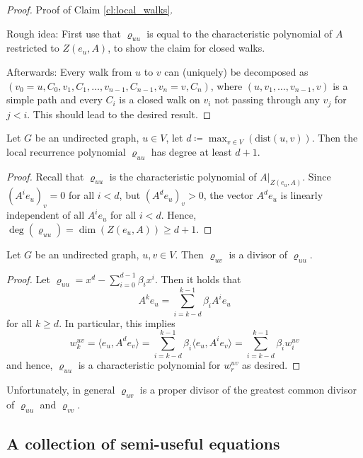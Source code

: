 \documentclass[a4paper,12pt]{article}
\begin{document}
\begin{proof}
Proof of Claim \ref{cl:local_walks}.

\noindent Rough idea: First use that $\varrho_{uu}$ is equal to the characteristic polynomial of $A$ restricted to $Z(e_u,A)$, to show the claim for closed walks.

Afterwards: Every walk from $u$ to $v$ can (uniquely) be decomposed as $(v_0=u, C_0, v_1, C_1, \ldots,v_{n-1}, C_{n-1}, v_n=v, C_n)$, where $(u, v_1, \ldots, v_{n-1}, v)$ is a simple path and every $C_i$ is a closed walk on $v_i$ not passing through any $v_j$ for $j < i$. This should lead to the desired result.
\end{proof}

\begin{cor}
Let $G$ be an undirected graph, $u \in V$, let $d \coloneqq \max_{v\in V}(\text{dist}(u,v))$. Then the local recurrence polynomial $\varrho_{uu}$ has degree at least $d+1$.
\end{cor}

\begin{proof}
Recall that $\varrho_{uu}$ is the characteristic polynomial of $A|_{Z(e_u,A)}$. Since $\left(A^ie_u\right)_v = 0$ for all $i < d$, but $\left(A^de_u\right)_v > 0$, the vector $A^de_u$ is linearly independent of all $A^ie_u$ for all $i < d$. Hence, $\deg\left(\varrho_{uu}\right) = \dim\left(Z(e_u,A)\right) \ge d+1$.
\end{proof}

\begin{cor}
Let $G$ be an undirected graph, $u,v\in V$. Then $\varrho_{uv}$ is a divisor of $\varrho_{uu}$.
\end{cor}

\begin{proof}
Let $\varrho_{uu} = x^d - \sum_{i=0}^{d-1} \beta_ix^i$. Then it holds that
$$
A^ke_u = \sum_{i=k-d}^{k-1}\beta_iA^ie_u
$$
for all $k \ge d$. In particular, this implies
$$
w_k^{uv} = \langle e_u, A^de_v\rangle = \sum_{i=k-d}^{k-1}\beta_i\langle e_u, A^ie_v\rangle = \sum_{i=k-d}^{k-1}\beta_iw_i^{uv}
$$
and hence, $\varrho_{uu}$ is a characteristic polynomial for $w_r^{uv}$ as desired.
\end{proof}

Unfortunately, in general $\varrho_{uv}$ is a proper divisor of the greatest common divisor of $\varrho_{uu}$ and $\varrho_{vv}$.

\subsection{A collection of semi-useful equations}
\end{document}
